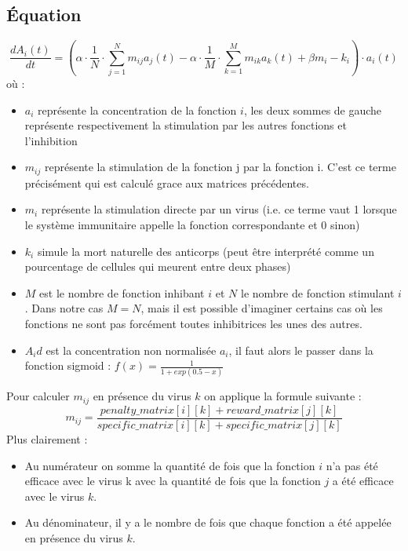 \documentclass[11pt]{article} %
\begin{document}
\subsection{\'Equation}
\begin{equation}
	\frac{dA_i(t)}{dt} = \left(\alpha\cdot\frac{1}{N}\cdot\sum_{j=1}^{N}m_{ij}a_j(t)-\alpha \cdot \frac{1}{M}\cdot\sum_{k=1}^{M}m_{ik}a_k(t)+\beta m_i-k_i\right)\cdot a_i(t)
	\label{equation21}
\end{equation}
où : 
\begin{itemize}
	\item $a_i$ représente la concentration de la fonction $i$, les deux sommes de gauche représente respectivement la stimulation par les autres fonctions et l'inhibition
	\item $m_{ij}$ représente la stimulation de la fonction j par la fonction i. C'est ce terme précisément qui est calculé grace aux matrices précédentes.
	\item $m_i$ représente la stimulation directe par un virus (i.e. ce terme vaut 1 lorsque le système immunitaire appelle la fonction correspondante et 0 sinon)
	\item $k_i$ simule la mort naturelle des anticorps (peut être interprété comme un pourcentage de cellules qui meurent entre deux phases)
	\item $M$ est le nombre de fonction inhibant $i$ et $N$ le nombre de fonction stimulant $i$. Dans notre cas $M=N$, mais il est possible d'imaginer certains cas où les fonctions ne sont pas forcément toutes inhibitrices les unes des autres.
	\item $A_id$ est la concentration non normalisée  $a_i$, il faut alors le passer dans la fonction sigmoid : $f(x) = \frac{1}{1 + exp(0.5 - x)}$
\end{itemize}

Pour calculer $m_{ij}$ en présence du virus $k$ on applique la formule suivante \cite{ref}:
\begin{equation}
	m_{ij} = \frac {penalty\_matrix[i][k] + reward\_matrix[j][k]}{specific\_matrix[i][k] + specific\_matrix[j][k]}
\end{equation}
Plus clairement :
\begin{itemize}
	\item Au numérateur on somme la quantité de fois que la fonction $i$ n'a pas été efficace avec le virus k avec la quantité de fois que la fonction $j$ a été efficace avec le virus $k$.
	\item Au dénominateur, il y a le nombre de fois que chaque fonction a été appelée en présence du virus $k$.
\end{itemize}
\end{document}
